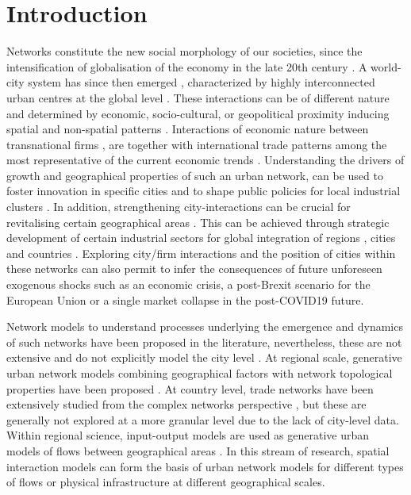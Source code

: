 \documentclass[10pt,letterpaper]{article}
\begin{document}
\linenumbers



\section*{Introduction}

Networks constitute the new social morphology of our societies, since the intensification of globalisation of the economy in the late 20th century \cite{castells2000networksociety}. A world-city system has since then emerged \cite{taylor2001specification}, characterized by highly interconnected urban centres at the global level \cite{sassen1991}. These interactions can be of different nature and determined by economic, socio-cultural, or geopolitical proximity inducing spatial and non-spatial patterns \cite{martinus2018global}. Interactions of economic nature between transnational firms \cite{derudder2018central}, are together with international trade patterns among the most representative of the current economic trends \cite{taylor2001specification}. Understanding the drivers of growth and geographical properties of such an urban network, can be used to foster innovation in specific cities and to shape public policies for local industrial clusters \cite{turkina2016structure}. In addition, strengthening city-interactions can be crucial for revitalising certain geographical areas \cite{Clarke2018}. This can be achieved through strategic development of certain industrial sectors for global integration of regions \cite{dawley2019creating}, cities \cite{gluckler2016relational} and countries \cite{martinus2019brokerage}. Exploring city/firm interactions \cite{storme2019introducing} and the position of cities within these networks \cite{gluckler2016relational} can also permit to infer the consequences of future unforeseen exogenous shocks such as an economic crisis, a post-Brexit scenario for the European Union or a single market collapse in the post-COVID19 future.

Network models to understand processes underlying the emergence and dynamics of such networks have been proposed in the literature, nevertheless, these are not extensive and do not explicitly model the city level \cite{taylor2001specification}. At regional scale, generative urban network models combining geographical factors with network topological properties have been proposed \cite{dai2016simulating}. At country level, trade networks have been extensively studied from the complex networks perspective \cite{garlaschelli2005structure}, but these are generally not explored at a more granular level due to the lack of city-level data. Within regional science, input-output models are used as generative urban models of flows between geographical areas \cite{jin1993generation}. In this stream of research, spatial interaction models \cite{dennett2013multilevel} can form the basis of urban network models for different types of flows \cite{dai2016generative} or physical infrastructure \cite{raimbault2018indirect} at different geographical scales.
\end{document}
